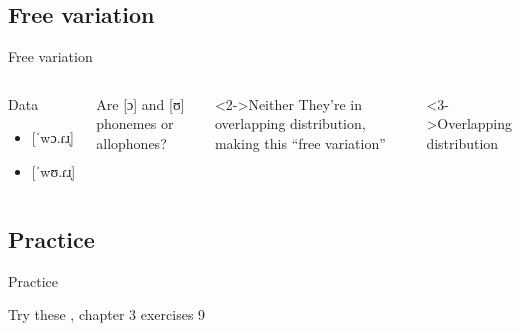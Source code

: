 \documentclass{beamer}
\newcommand{\subtwothree}{Free variation}
\newcommand{\subtwofour}{Practice}
\begin{document}
    \subsection{\subtwothree}
      \begin{frame}{\subtwothree}
        \begin{columns}
            \begin{block}{Data}
              \begin{itemize}
                \item {[}ˈwɔ.ɾɹ̩]
                \item {[}ˈwʊ.ɾɹ̩]
              \end{itemize}
            \end{block}
            \begin{block}{}
              Are [ɔ] and [ʊ] phonemes or allophones?
            \end{block}
            \begin{block}<2->{Neither}
              They're in overlapping distribution, making this ``free variation''
            \end{block}
            \begin{alertblock}<3->{Overlapping distribution}
              
            \end{alertblock}
        \end{columns}
      \end{frame}

    \subsection{\subtwofour}
      \begin{frame}{\subtwofour}
        \begin{block}{Try these}
          \textcite{dawson_language_2016}, chapter 3 exercises 9
        \end{block}
      \end{frame}
\end{document}
